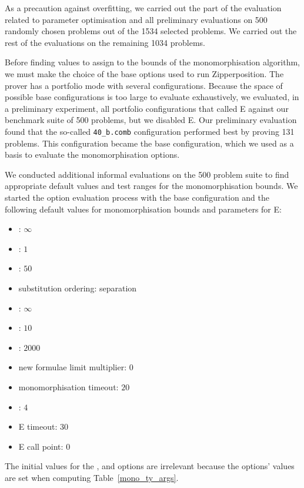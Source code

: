 \documentclass[runningheads]{llncs}
\begin{document}
As a precaution against overfitting, we carried out the part of the evaluation related to parameter optimisation and all preliminary evaluations on 500 randomly chosen problems out of the 1534 selected problems. We carried out the rest of the evaluations on the remaining 1034 problems.

Before finding values to assign to the bounds of the monomorphisation algorithm, we must make the choice of the base options used to run Zipperposition. The prover has a portfolio mode with several configurations. Because the space of possible base configurations is too large to evaluate exhaustively, we evaluated, in a preliminary experiment, all portfolio configurations that called E against our benchmark suite of 500 problems, but we disabled E.
Our preliminary evaluation found that the so-called \verb|40_b.comb| configuration performed best by proving 131 problems.
This configuration became the base configuration, which we used as a basis to evaluate the monomorphisation options.

We conducted additional informal evaluations on the 500 problem suite to find appropriate default values and test ranges for the monomorphisation bounds. We started the option evaluation process with the base configuration and the following default values for monomorphisation bounds and parameters for E:
%
\begin{minipage}[t]{.5\textwidth}
\topsep

\begin{itemize}
   \item \PolyCap: \(\infty\)
   \item \PolyMult: \(1\)
   \item \PolyFloor: \(50\)
   \item substitution ordering: separation
   \item \SubstLimit: \(\infty\)
   \item \MonoSubstsLimit: \(10\)
\end{itemize}

\topsep
\end{minipage}\begin{minipage}[t]{.5\textwidth}
\topsep

\begin{itemize}
   \item \Limit: \(2000\)
   \item new formulae limit multiplier: \(0\)
   \item monomorphisation timeout: \(20\)
   \item \Loop: \(4\)
   \item E timeout: \(30\)
   \item E call point: \(0\)
\end{itemize}

\topsep
\end{minipage}
%
The initial values for the \MonoCap, \MonoMult and \MonoFloor options are irrelevant because the options' values are set when computing Table~\ref{mono_ty_args}.%
\end{document}
